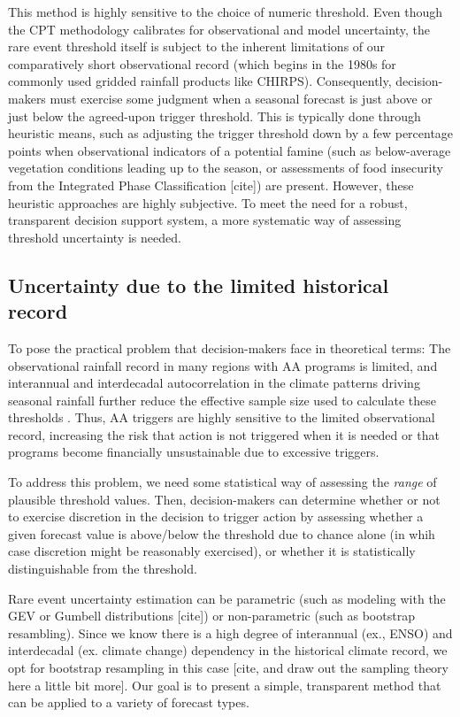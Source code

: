 \documentclass{ametsocV5}
\begin{document}
This method is highly sensitive to the choice of numeric threshold. Even though the CPT methodology calibrates for observational and model uncertainty, the rare event threshold itself is subject to the inherent limitations of our comparatively short observational record (which begins in the 1980s for commonly used gridded rainfall products like CHIRPS). Consequently, decision-makers must exercise some judgment when a seasonal forecast is just above or just below the agreed-upon trigger threshold. This is typically done through heuristic means, such as adjusting the trigger threshold down by a few percentage points when observational indicators of a potential famine (such as below-average vegetation conditions leading up to the season, or assessments of food insecurity from the Integrated Phase Classification [cite]) are present. However, these heuristic approaches are highly subjective. To meet the need for a robust, transparent decision support system, a more systematic way of assessing threshold uncertainty is needed. 

\subsection{Uncertainty due to the limited historical record}

To pose the practical problem that decision-makers face in theoretical terms: The observational rainfall record in many regions with AA programs is limited, and interannual and interdecadal autocorrelation in the climate patterns driving seasonal rainfall further reduce the effective sample size used to calculate these thresholds \citep{martinez_seasonal_2022}. Thus, AA triggers are highly sensitive to the limited observational record, increasing the risk that action is not triggered when it is needed or that programs become financially unsustainable due to excessive triggers. 

To address this problem, we need some statistical way of assessing the \textit{range} of plausible threshold values. Then, decision-makers can determine whether or not to exercise discretion in the decision to trigger action by assessing whether a given forecast value is above/below the threshold due to chance alone (in whih case discretion might be reasonably exercised), or whether it is statistically distinguishable from the threshold.

Rare event uncertainty estimation can be parametric (such as modeling with the GEV or Gumbell distributions [cite]) or non-parametric (such as bootstrap resambling). Since we know there is a high degree of interannual (ex., ENSO) and interdecadal (ex. climate change) dependency in the historical climate record, we opt for bootstrap resampling in this case [cite, and draw out the sampling theory here a little bit more]. Our goal is to present a simple, transparent method that can be applied to a variety of forecast types. 
\end{document}
